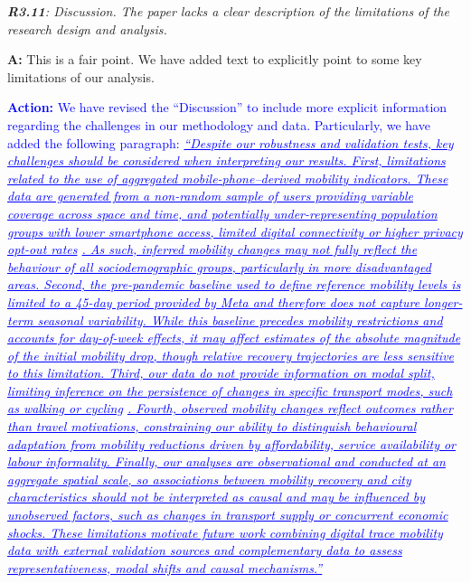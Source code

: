 \documentclass[12pt,a4paper,oneside, reqno]{amsart}
\begin{document}
\setlength{\leftskip}{0cm} \textit{\textbf{R3.11}: Discussion. The paper lacks a clear description of the limitations of the research design and analysis.}

\setlength{\leftskip}{1cm}\textbf{A:} This is a fair point. We have added text to explicitly point to some key limitations of our analysis.

\textcolor{blue}{
\textbf{Action:} We have revised the ``Discussion'' to include more explicit information regarding the challenges in our methodology and data. Particularly, we have added the following paragraph: \textit{\ul{``Despite our robustness and validation tests, key challenges should be considered when interpreting our results. First, limitations related to the use of aggregated mobile-phone–derived mobility indicators. These data are generated from a non-random sample of users providing variable coverage across space and time, and potentially under-representing population groups with lower smartphone access, limited digital connectivity or higher privacy opt-out rates} \parencite{cabrera2025bias}\ul{. As such, inferred mobility changes may not fully reflect the behaviour of all sociodemographic groups, particularly in more disadvantaged areas. Second, the pre-pandemic baseline used to define reference mobility levels is limited to a 45-day period provided by Meta and therefore does not capture longer-term seasonal variability. While this baseline precedes mobility restrictions and accounts for day-of-week effects, it may affect estimates of the absolute magnitude of the initial mobility drop, though relative recovery trajectories are less sensitive to this limitation. Third, our data do not provide information on modal split, limiting inference on the persistence of changes in specific transport modes, such as walking or cycling} \parencite{zhang2023impacts}\ul{. Fourth, observed mobility changes reflect outcomes rather than travel motivations, constraining our ability to distinguish behavioural adaptation from mobility reductions driven by affordability, service availability or labour informality. Finally, our analyses are observational and conducted at an aggregate spatial scale, so associations between mobility recovery and city characteristics should not be interpreted as causal and may be influenced by unobserved factors, such as changes in transport supply or concurrent economic shocks. These limitations motivate future work combining digital trace mobility data with external validation sources and complementary data to assess representativeness, modal shifts and causal mechanisms.''}}
}

\newpage

\clearpage
\pagestyle{plain}   
\printbibliography  
\end{document}
